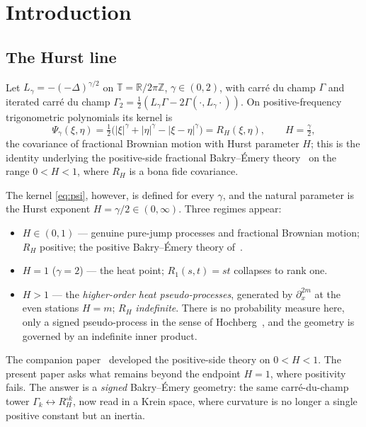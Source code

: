 \documentclass[11pt,reqno]{amsart}
\theoremstyle{plain}
\theoremstyle{definition}
\newcommand{\T}{\mathbb{T}}
\newcommand{\R}{\mathbb{R}}
\newcommand{\Z}{\mathbb{Z}}
\newcommand{\Had}{\mathbin{\circ}}
\newcommand{\Gam}{\Gamma}
\begin{document}
\section{Introduction}\label{sec:intro}

\subsection*{The Hurst line}
Let $L_\gamma=-(-\Delta)^{\gamma/2}$ on $\T=\R/2\pi\Z$, $\gamma\in(0,2)$, with
carr\'e du champ $\Gam$ and iterated carr\'e du champ
$\Gam_2=\tfrac12(L_\gamma\Gam-2\Gam(\cdot,L_\gamma\cdot))$. On positive-frequency
trigonometric polynomials its kernel is
\begin{equation}\label{eq:psi}
  \Psi_\gamma(\xi,\eta)=\tfrac12\bigl(|\xi|^\gamma+|\eta|^\gamma-|\xi-\eta|^\gamma\bigr)
  =R_H(\xi,\eta),\qquad H=\tfrac\gamma2,
\end{equation}
the covariance of fractional Brownian motion with Hurst parameter $H$; this is the
identity underlying the positive-side fractional Bakry--\'Emery
theory~\cite{FontesPartI} on the range $0<H<1$, where $R_H$ is a bona fide
covariance.

The kernel \eqref{eq:psi}, however, is defined for every $\gamma$, and the natural
parameter is the Hurst exponent $H=\gamma/2\in(0,\infty)$. Three regimes appear:
\begin{itemize}[leftmargin=1.5em]
\item $H\in(0,1)$ --- genuine pure-jump processes and fractional Brownian motion;
  $R_H$ positive; the positive Bakry--\'Emery theory of~\cite{FontesPartI}.
\item $H=1$ ($\gamma=2$) --- the heat point; $R_1(s,t)=st$ collapses to rank one.
\item $H>1$ --- the \emph{higher-order heat pseudo-processes}, generated by
  $\partial_x^{2m}$ at the even stations $H=m$; $R_H$ \emph{indefinite}. There is
  no probability measure here, only a signed pseudo-process in the sense of
  Hochberg~\cite{Hochberg}, and the geometry is governed by an indefinite inner
  product.
\end{itemize}

The companion paper~\cite{FontesPartI} developed the positive-side theory on
$0<H<1$. The present paper asks what remains beyond the endpoint $H=1$, where
positivity fails. The answer is a
\emph{signed} Bakry--\'Emery geometry: the same carr\'e-du-champ tower
$\Gam_k\leftrightarrow R_H^{\Had k}$, now read in a Krein space, where curvature
is no longer a single positive constant but an inertia.
\end{document}
